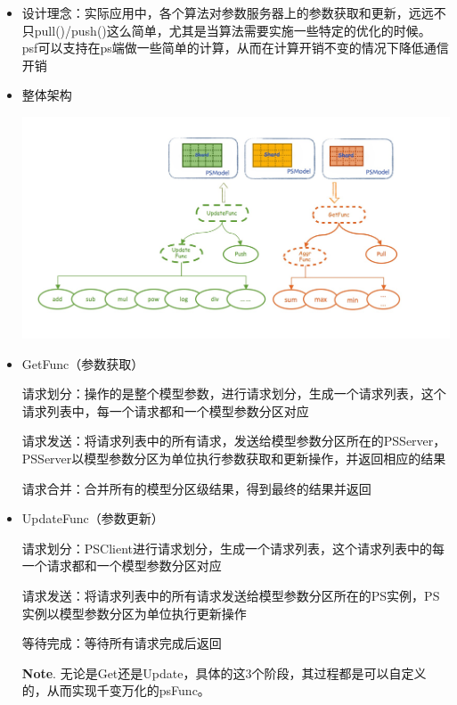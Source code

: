\documentclass{article}
\begin{document}
\begin{itemize}[noitemsep,topsep=\mdcompacttopsep]%

\item{}设计理念：实际应用中，各个算法对参数服务器上的参数获取和更新，远远不只pull()/push()这么简单，尤其是当算法需要实施一些特定的优化的时候。
psf可以支持在ps端做一些简单的计算，从而在计算开销不变的情况下降低通信开销%

\item{}
整体架构%

\includegraphics[keepaspectratio=true,width=\dimmin{}{\dimwidth{0.90}}]{images/angel_psFunc}{}%

\item{}
GetFunc（参数获取）%

请求划分：操作的是整个模型参数，进行请求划分，生成一个请求列表，这个请求列表中，每一个请求都和一个模型参数分区对应%

请求发送：将请求列表中的所有请求，发送给模型参数分区所在的PSServer，PSServer以模型参数分区为单位执行参数获取和更新操作，并返回相应的结果%

请求合并：合并所有的模型分区级结果，得到最终的结果并返回%

\item{}
UpdateFunc（参数更新）%

请求划分：PSClient进行请求划分，生成一个请求列表，这个请求列表中的每一个请求都和一个模型参数分区对应%

请求发送：将请求列表中的所有请求发送给模型参数分区所在的PS实例，PS实例以模型参数分区为单位执行更新操作%

等待完成：等待所有请求完成后返回%

\noindent{}\textbf{Note}.
无论是Get还是Update，具体的这3个阶段，其过程都是可以自定义的，从而实现千变万化的psFunc。%
\end{itemize}%
\end{document}
